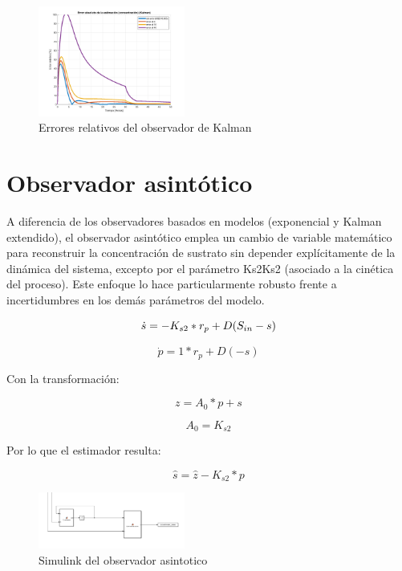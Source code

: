 \documentclass[letterpaper, 10 pt, conference]{ieeeconf}  %
\begin{document}
\begin{figure}[H]
  \centering
  \includegraphics[width=0.43\textwidth]{./Images_tp2/kalman_error.png}
  \caption{Errores relativos del observador de Kalman}
\end{figure}


\section{Observador asintótico}

A diferencia de los observadores basados en modelos (exponencial y Kalman extendido), el observador asintótico emplea un cambio de variable matemático para reconstruir la concentración de sustrato sin depender explícitamente de la dinámica del sistema, excepto por el parámetro Ks2Ks2​ (asociado a la cinética del proceso). Este enfoque lo hace particularmente robusto frente a incertidumbres en los demás parámetros del modelo.

\begin{equation*}
  \dot{s} = -K_{s2} * r_{p} + D(S_{in} - s) \\
\end{equation*}

\begin{equation*}
  \dot{p} = 1 * r_{p} + D(-s)
\end{equation*}

Con la transformación:

\begin{equation*}
  z = A_{0} * p + s
\end{equation*}

\begin{equation*}
  A_{0} = K_{s2}
\end{equation*}

Por lo que el estimador resulta:

\begin{equation*}
  \hat{s} = \hat{z} - K_{s2} * p
\end{equation*}

\begin{figure}[H]
  \centering
  \includegraphics[width=0.43\textwidth]{./Images_tp2/simulink_asintotico.png}
  \caption{Simulink del observador asintotico}
\end{figure}
\end{document}
